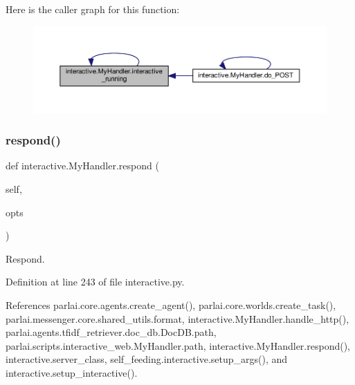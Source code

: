 Here is the caller graph for this function\+:
\nopagebreak
\begin{figure}[H]
\begin{center}
\leavevmode
\includegraphics[width=350pt]{classinteractive_1_1MyHandler_ada828133485ee47cad9bfadf450fc49a_icgraph}
\end{center}
\end{figure}
\mbox{\label{classinteractive_1_1MyHandler_a90d22dc71dcfeeedcb3c6d4ce61cccf1}} 
\subsubsection{\texorpdfstring{respond()}{respond()}\hspace{0.1cm}{\footnotesize\ttfamily [1/2]}}
{\footnotesize\ttfamily def interactive.\+My\+Handler.\+respond (\begin{DoxyParamCaption}\item[{}]{self,  }\item[{}]{opts }\end{DoxyParamCaption})}

\begin{DoxyVerb}Respond.\end{DoxyVerb}
 

Definition at line 243 of file interactive.\+py.



References parlai.\+core.\+agents.\+create\+\_\+agent(), parlai.\+core.\+worlds.\+create\+\_\+task(), parlai.\+messenger.\+core.\+shared\+\_\+utils.\+format, interactive.\+My\+Handler.\+handle\+\_\+http(), parlai.\+agents.\+tfidf\+\_\+retriever.\+doc\+\_\+db.\+Doc\+D\+B.\+path, parlai.\+scripts.\+interactive\+\_\+web.\+My\+Handler.\+path, interactive.\+My\+Handler.\+respond(), interactive.\+server\+\_\+class, self\+\_\+feeding.\+interactive.\+setup\+\_\+args(), and interactive.\+setup\+\_\+interactive().

